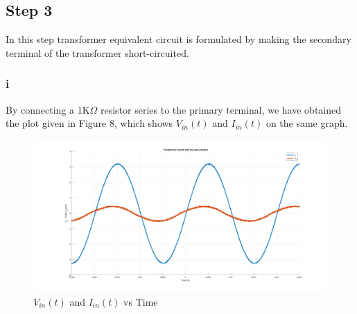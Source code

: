 \documentclass[letterpaper,12pt]{article}
\begin{document}
\subsection{Step 3}
In this step transformer equivalent circuit is formulated by making the secondary terminal of the transformer short-circuited.
\subsubsection{i}


%
By connecting a 1K\(\Omega\) resistor series to the primary terminal, we have obtained the plot given in Figure 8, which shows \(V_{in}(t) \) and \(I_{in}(t)\) on the same graph.  
\begin{figure}[H]
    \centering
    \includegraphics[width = 1\textwidth]{3_1.png}
    \caption{\(V_{in}(t) \) and \(I_{in}(t)\) vs Time }
\end{figure} 
\end{document}
